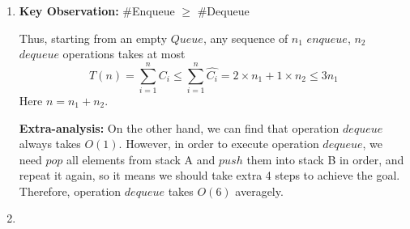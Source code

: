 \documentclass[12pt,a4paper]{article}
\makeatletter
\newtheorem*{solution}{Solution}
\theoremstyle{definition}
\renewenvironment{solution}[1][Solution] {\par\pushQED{\qed}\normalfont\topsep6\p@\@plus6\p@\relax\trivlist\item[\hskip\labelsep\bfseries#1\@addpunct{.}]\ignorespaces}{\popQED\endtrivlist\@endpefalse} \makeatother
\makeatother
\begin{document}
\begin{enumerate}
\begin{solution}
\begin{itemize}
\begin{itemize}
                \par
            \textbf{Key Observation:} \#Enqueue $\geq$ \#Dequeue\par
            Thus, starting from an empty $Queue$, any sequence of $n_1$ $enqueue$, $n_2$ $dequeue$ operations takes at most
            $$T(n) = \sum_{i=1}^{n} C_i \leq 
            \sum_{i=1}^{n} \hat{C_i} = 2 \times n_1 + 1 \times n_2 \leq 3n_1 $$ Here $n = n_1+n_2$.	
            \par\textbf{Extra-analysis:} On the other hand, we can find that operation $dequeue$ always takes $O(1)$. However, in order to execute operation $dequeue$, we need $pop$ all elements from stack A and $push$ them into stack B in order, and repeat it again, so it means we should take extra 4 steps to achieve the goal. Therefore, operation $dequeue$ takes $O(6)$ averagely.
            \end{itemize}
        \end{itemize}
        \item
    \end{solution}


\end{enumerate}

\vspace{20pt}
\end{document}
